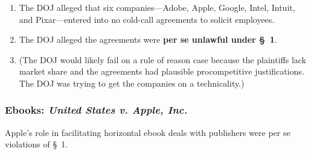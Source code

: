 \begin{enumerate}
    \item The DOJ alleged that six companies---Adobe, Apple, Google, Intel, 
    Intuit, and Pixar---entered into no cold-call agreements to solicit 
    employees.
    \item The DOJ alleged the agreements were \textbf{per se unlawful under \S\ 
    1}.
    \item (The DOJ would likely fail on a rule of reason case because the 
    plaintiffs lack market share and the agreements had plausible procompetitive 
    justifications. The DOJ was trying to get the companies on a technicality.)
\end{enumerate}

\subsubsection{Ebooks: \emph{United States v. Apple, Inc.}}

Apple's role in facilitating horizontal ebook deals with publishers were per se 
violations of \S\ 1.

